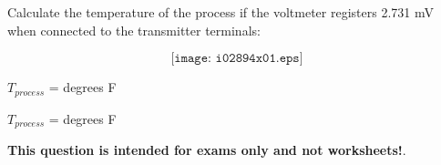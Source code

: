 

Calculate the temperature of the process if the voltmeter registers 2.731 mV when connected to the transmitter terminals:

$$\texttt{[image: i02894x01.eps]}$$

$T_{process}$ = \underbar{\hskip 50pt} degrees F







$T_{process}$ =  degrees F
 






{\bf This question is intended for exams only and not worksheets!}.



